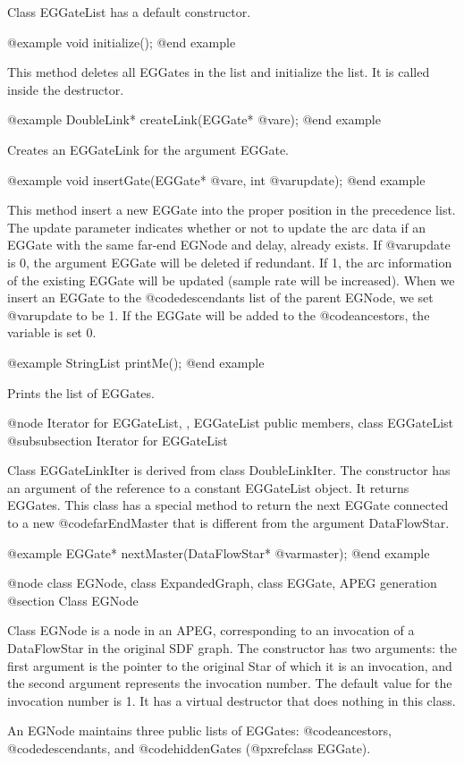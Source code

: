 Class EGGateList has a default constructor. 

@example
void initialize();
@end example

This method deletes all EGGates in the list and initialize the list.
It is called inside the destructor.

@example
DoubleLink* createLink(EGGate* @var{e});
@end example

Creates an EGGateLink for the argument EGGate.

@example
void insertGate(EGGate* @var{e}, int @var{update});
@end example

This method insert a new EGGate into the proper position in the precedence
list. The update parameter indicates whether or not to update the arc
data if an EGGate with the same far-end EGNode and delay, already exists.
If @var{update} is 0, the argument EGGate will be deleted if redundant.
If 1, the arc information of the existing EGGate will be updated (sample
rate will be increased). When we insert an EGGate to the
@code{descendants} list of the parent EGNode, we set @var{update} to be 1.
If the EGGate will be added to the @code{ancestors}, the variable is set 0.

@example
StringList printMe();
@end example

Prints the list of EGGates.

@node Iterator for EGGateList, , EGGateList public members, class EGGateList
@subsubsection Iterator for EGGateList

Class EGGateLinkIter is derived from class DoubleLinkIter. The constructor
has an argument of the reference to a constant EGGateList object. It returns
EGGates. This class has a special method to return the next EGGate connected
to a new @code{farEndMaster} that is different from the argument DataFlowStar.

@example
EGGate* nextMaster(DataFlowStar* @var{master});
@end example

@node class EGNode, class ExpandedGraph, class EGGate, APEG generation
@section Class EGNode

Class EGNode is a node in an APEG, corresponding to an invocation of a
DataFlowStar in the original SDF graph. The constructor has two arguments:
the first argument is the pointer to the original Star of which it is an
invocation, and the second argument represents the invocation number.
The default value for the invocation number is 1. It has a virtual
destructor that does nothing in this class.

An EGNode maintains three public lists of EGGates: @code{ancestors},
@code{descendants}, and @code{hiddenGates} (@pxref{class EGGate}).

